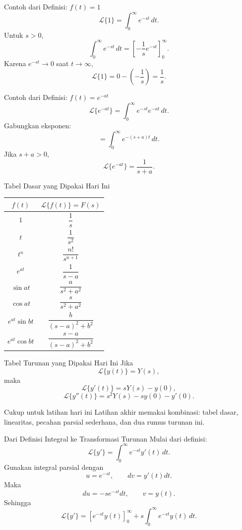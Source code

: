 \documentclass[aspectratio=169,11pt]{beamer}
\newcommand{\Lap}{\mathcal{L}}
\begin{document}
\begin{frame}{Contoh dari Definisi: $f(t)=1$}
\[
\Lap\{1\}=\int_0^\infty e^{-st}\,dt.
\]
Untuk $s>0$,
\[
\int_0^\infty e^{-st}\,dt
=\left[-\frac{1}{s}e^{-st}\right]_0^\infty.
\]
Karena $e^{-st}\to0$ saat $t\to\infty$,
\[
\Lap\{1\}=0-\left(-\frac{1}{s}\right)=\frac{1}{s}.
\]
\end{frame}

\begin{frame}{Contoh dari Definisi: $f(t)=e^{-at}$}
\[
\Lap\{e^{-at}\}=\int_0^\infty e^{-st}e^{-at}\,dt.
\]
Gabungkan eksponen:
\[
=\int_0^\infty e^{-(s+a)t}\,dt.
\]
Jika $s+a>0$,
\[
\Lap\{e^{-at}\}=\frac{1}{s+a}.
\]
\end{frame}

\begin{frame}{Tabel Dasar yang Dipakai Hari Ini}
\small
\begin{center}
\begin{tabular}{c c}
\toprule
$f(t)$ & $\Lap\{f(t)\}=F(s)$ \\
\midrule
$1$ & $\dfrac{1}{s}$ \\[1mm]
$t$ & $\dfrac{1}{s^2}$ \\[1mm]
$t^n$ & $\dfrac{n!}{s^{n+1}}$ \\[1mm]
$e^{at}$ & $\dfrac{1}{s-a}$ \\[1mm]
$\sin at$ & $\dfrac{a}{s^2+a^2}$ \\[1mm]
$\cos at$ & $\dfrac{s}{s^2+a^2}$ \\[1mm]
$e^{at}\sin bt$ & $\dfrac{b}{(s-a)^2+b^2}$ \\[1mm]
$e^{at}\cos bt$ & $\dfrac{s-a}{(s-a)^2+b^2}$ \\
\bottomrule
\end{tabular}
\end{center}
\end{frame}

\begin{frame}{Tabel Turunan yang Dipakai Hari Ini}
Jika
\[
\Lap\{y(t)\}=Y(s),
\]
maka
\[
\Lap\{y'(t)\}=sY(s)-y(0),
\]
\[
\Lap\{y''(t)\}=s^2Y(s)-sy(0)-y'(0).
\]
\begin{alertblock}{Cukup untuk latihan hari ini}
Latihan akhir memakai kombinasi: tabel dasar, linearitas, pecahan parsial sederhana, dan dua rumus turunan ini.
\end{alertblock}
\end{frame}

\begin{frame}{Dari Definisi Integral ke Transformasi Turunan}
Mulai dari definisi:
\[
\Lap\{y'\}=\int_0^\infty e^{-st}y'(t)\,dt.
\]
Gunakan integral parsial dengan
\[
u=e^{-st},\qquad dv=y'(t)dt.
\]
Maka
\[
du=-se^{-st}dt,\qquad v=y(t).
\]
Sehingga
\[
\Lap\{y'\}=\left[e^{-st}y(t)\right]_0^\infty+s\int_0^\infty e^{-st}y(t)\,dt.
\]
\end{frame}
\end{document}
